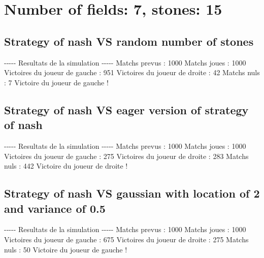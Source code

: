 \documentclass{article}%
\begin{document}
%
\normalsize%
\section{Number of fields: 7, stones: 15}%
\label{sec:Number of fields 7, stones 15}%
\subsection{Strategy of nash VS random number of stones}%
\label{subsec:Strategy of nash VS random number of stones}%
{-}{-}{-}{-}{-} Resultats de la simulation {-}{-}{-}{-}{-}\newline%
		\newline%
Matchs prevus : 1000\newline%
Matchs joues : 1000\newline%
\newline%
Victoires du joueur de gauche : 951\newline%
Victoires du joueur de droite : 42\newline%
Matchs nuls : 7\newline%
\newline%
Victoire du joueur de gauche !

%
\subsection{Strategy of nash VS eager version of strategy of nash}%
\label{subsec:Strategy of nash VS eager version of strategy of nash}%
{-}{-}{-}{-}{-} Resultats de la simulation {-}{-}{-}{-}{-}\newline%
		\newline%
Matchs prevus : 1000\newline%
Matchs joues : 1000\newline%
\newline%
Victoires du joueur de gauche : 275\newline%
Victoires du joueur de droite : 283\newline%
Matchs nuls : 442\newline%
\newline%
Victoire du joueur de droite !

%
\subsection{Strategy of nash VS gaussian with location of 2 and variance of 0.5}%
\label{subsec:Strategy of nash VS gaussian with location of 2 and variance of 0.5}%
{-}{-}{-}{-}{-} Resultats de la simulation {-}{-}{-}{-}{-}\newline%
		\newline%
Matchs prevus : 1000\newline%
Matchs joues : 1000\newline%
\newline%
Victoires du joueur de gauche : 675\newline%
Victoires du joueur de droite : 275\newline%
Matchs nuls : 50\newline%
\newline%
Victoire du joueur de gauche !
\end{document}
